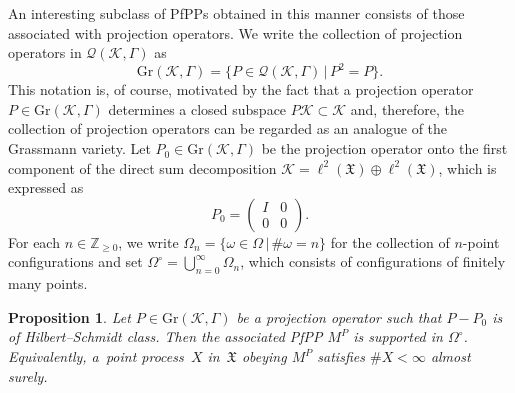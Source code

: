 \documentclass[pdftex]{sigma}
\numberwithin{equation}{section}
\newtheorem{Proposition}[Theorem]{Proposition}
 { \theoremstyle{definition}
\newtheorem{Definition}[Theorem]{Definition}
\newtheorem{Example}[Theorem]{Example}
\newtheorem{Remark}[Theorem]{Remark} }
\newcommand{\mfrak}[1]{\mathfrak{#1}}
\newcommand{\mcal}[1]{\mathcal{#1}}
\newcommand{\mbb}[1]{\mathbb{#1}}
\newcommand{\mrm}[1]{\mathrm{#1}}
\begin{document}
An interesting subclass of PfPPs obtained in this manner consists of those associated with projection operators.
We write the collection of projection operators in $\mcal{Q}(\mcal{K},\Gamma)$ as
\begin{equation*}
	\mrm{Gr}(\mcal{K},\Gamma)=\big\{P\in\mcal{Q}(\mcal{K},\Gamma)\,|\,P^{2}=P\big\}.
\end{equation*}
This notation is, of course, motivated by the fact that a projection operator $P\in\mrm{Gr}(\mcal{K},\Gamma)$ determines a closed subspace $P\mcal{K}\subset\mcal{K}$ and, therefore, the collection of projection operators can be regarded as an analogue of the Grassmann variety.
Let $P_{0}\in \mrm{Gr}(\mcal{K},\Gamma)$ be the projection operator onto the first component of the direct sum decomposition $\mcal{K}=\ell^{2}(\mfrak{X})\oplus\ell^{2}(\mfrak{X})$, which is expressed as
\begin{equation}
\label{eq:projection_vacuum}
	P_{0}=\left(
	\begin{matrix}
		I & 0 \\
		0 & 0
	\end{matrix}
	\right).
\end{equation}
For each $n\in\mbb{Z}_{\ge 0}$, we write $\Omega_{n}=\{\omega\in \Omega\,|\, \#\omega=n\}$ for the collection of $n$-point configurations and set $\Omega^{\circ}=\bigcup_{n=0}^{\infty}\Omega_{n}$, which consists of configurations of finitely many points.

\begin{Proposition}\label{prop:finitary_PfPP}
Let $P\in \mrm{Gr}(\mcal{K},\Gamma)$ be a projection operator such that $P-P_{0}$ is of Hilbert--Schmidt class. Then the associated PfPP $M^{P}$ is supported in $\Omega^{\circ}$. Equivalently, a~point process~$X$ in~$\mfrak{X}$ obeying $M^{P}$ satisfies $\# X<\infty$ almost surely.
\end{Proposition}
\end{document}
